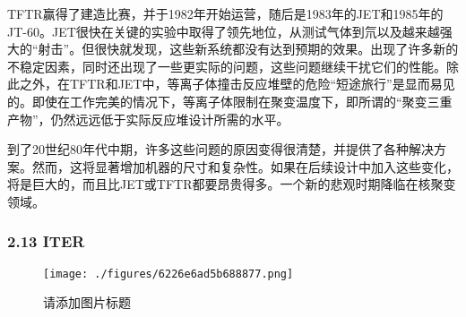 TFTR赢得了建造比赛，并于1982年开始运营，随后是1983年的JET和1985年的JT-60。JET很快在关键的实验中取得了领先地位，从测试气体到氘以及越来越强大的“射击”。但很快就发现，这些新系统都没有达到预期的效果。出现了许多新的不稳定因素，同时还出现了一些更实际的问题，这些问题继续干扰它们的性能。除此之外，在TFTR和JET中，等离子体撞击反应堆壁的危险“短途旅行”是显而易见的。即使在工作完美的情况下，等离子体限制在聚变温度下，即所谓的“聚变三重产物”，仍然远远低于实际反应堆设计所需的水平。

到了20世纪80年代中期，许多这些问题的原因变得很清楚，并提供了各种解决方案。然而，这将显著增加机器的尺寸和复杂性。如果在后续设计中加入这些变化，将是巨大的，而且比JET或TFTR都要昂贵得多。一个新的悲观时期降临在核聚变领域。
\subsubsection{2.13 ITER}
\begin{figure}[ht]
\centering
\texttt{[image: ./figures/6226e6ad5b688877.png]}
\caption{请添加图片标题} \label{fig_TKMK_4}
\end{figure}
